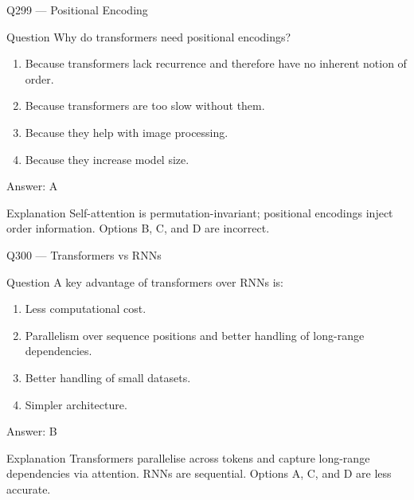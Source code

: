 \documentclass[aspectratio=169,8pt]{beamer}
\begin{document}
\begin{frame}{Q299 --- Positional Encoding}
\begin{block}{Question}
Why do transformers need positional encodings?
\begin{enumerate} 
\item Because transformers lack recurrence and therefore have no inherent notion of order.
\item Because transformers are too slow without them.
\item Because they help with image processing.
\item Because they increase model size.
\end{enumerate} \end{block}
\begin{exampleblock}{Answer: A}\end{exampleblock}
\begin{block}{Explanation}
Self-attention is permutation-invariant; positional encodings inject order information. Options B, C, and D are incorrect.
\end{block}
\end{frame}

\begin{frame}{Q300 --- Transformers vs RNNs}
\begin{block}{Question}
A key advantage of transformers over RNNs is:
\begin{enumerate}
\item Less computational cost.
\item Parallelism over sequence positions and better handling of long-range dependencies.
\item Better handling of small datasets.
\item Simpler architecture.
\end{enumerate}\end{block}
\begin{exampleblock}{Answer: B}\end{exampleblock}
\begin{block}{Explanation}
Transformers parallelise across tokens and capture long-range dependencies via attention. RNNs are sequential. Options A, C, and D are less accurate.
\end{block}
\end{frame}

\end{document}
